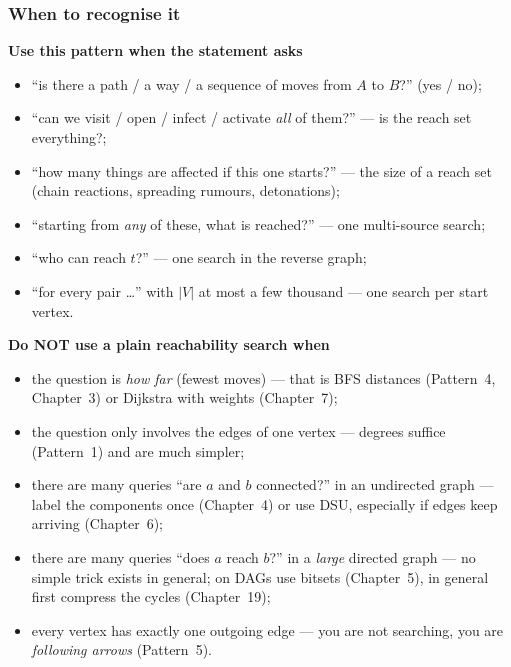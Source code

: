 \subsubsection*{When to recognise it}

\textbf{Use this pattern when the statement asks}
\begin{itemize}[leftmargin=*]
    \item ``is there a path / a way / a sequence of moves from $A$ to $B$?'' (yes / no);
    \item ``can we visit / open / infect / activate \emph{all} of them?'' --- is the reach set everything?;
    \item ``how many things are affected if this one starts?'' --- the size of a reach set (chain reactions, spreading rumours, detonations);
    \item ``starting from \emph{any} of these, what is reached?'' --- one multi-source search;
    \item ``who can reach $t$?'' --- one search in the reverse graph;
    \item ``for every pair \ldots'' with $|V|$ at most a few thousand --- one search per start vertex.
\end{itemize}

\textbf{Do NOT use a plain reachability search when}
\begin{itemize}[leftmargin=*]
    \item the question is \emph{how far} (fewest moves) --- that is BFS distances (Pattern~4, Chapter~3) or Dijkstra with weights (Chapter~7);
    \item the question only involves the edges of one vertex --- degrees suffice (Pattern~1) and are much simpler;
    \item there are many queries ``are $a$ and $b$ connected?'' in an undirected graph --- label the components once (Chapter~4) or use DSU, especially if edges keep arriving (Chapter~6);
    \item there are many queries ``does $a$ reach $b$?'' in a \emph{large} directed graph --- no simple trick exists in general; on DAGs use bitsets (Chapter~5), in general first compress the cycles (Chapter~19);
    \item every vertex has exactly one outgoing edge --- you are not searching, you are \emph{following arrows} (Pattern~5).
\end{itemize}

